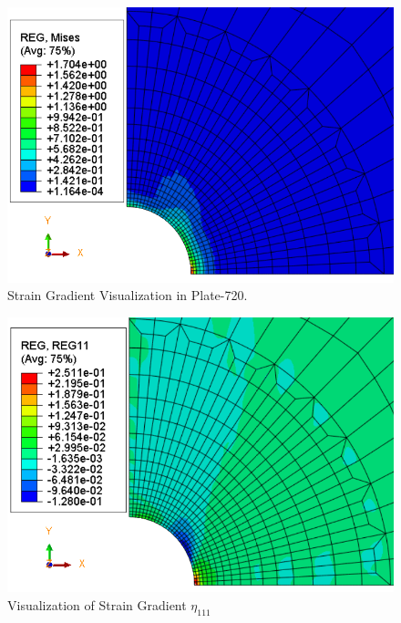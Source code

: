\documentclass[12pt]{article}
\begin{document}
\begin{figure}[H]
	\begin{center}
		\includegraphics[scale=0.9]{full_grad_crop.png} 
	\end{center}  
   \caption{Strain Gradient Visualization in Plate-720.}
\end{figure}
\begin{figure}[H]
	\begin{center}
		\includegraphics[scale=0.9]{Reg11_crop.png} 
	\end{center}  
   \caption{Visualization of Strain Gradient $\eta_{111} $}
\end{figure}
\end{document}
